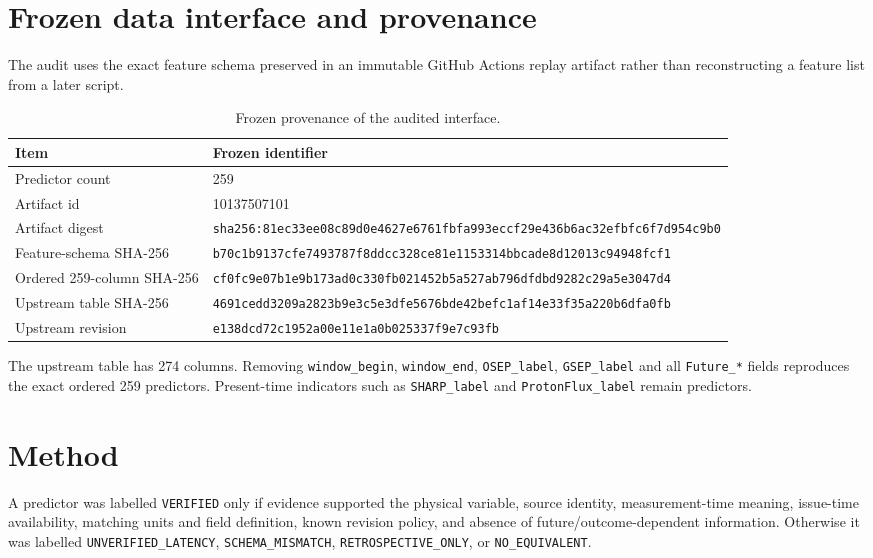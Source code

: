 \documentclass[11pt]{article}
\begin{document}
\section{Frozen data interface and provenance}
The audit uses the exact feature schema preserved in an immutable GitHub Actions replay artifact rather than reconstructing a feature list from a later script.

\begin{table}[h]\centering
\begin{tabular}{p{}p{}}\toprule
Item & Frozen identifier \\\midrule
Predictor count & 259 \\
Artifact id & 10137507101 \\
Artifact digest & \texttt{sha256:81ec33ee08c89d0e4627e6761fbfa993eccf29e436b6ac32efbfc6f7d954c9b0} \\
Feature-schema SHA-256 & \texttt{b70c1b9137cfe7493787f8ddcc328ce81e1153314bbcade8d12013c94948fcf1} \\
Ordered 259-column SHA-256 & \texttt{cf0fc9e07b1e9b173ad0c330fb021452b5a527ab796dfdbd9282c29a5e3047d4} \\
Upstream table SHA-256 & \texttt{4691cedd3209a2823b9e3c5e3dfe5676bde42befc1af14e33f35a220b6dfa0fb} \\
Upstream revision & \texttt{e138dcd72c1952a00e11e1a0b025337f9e7c93fb} \\\bottomrule
\end{tabular}\caption{Frozen provenance of the audited interface.}\end{table}

The upstream table has 274 columns. Removing \texttt{window\_begin}, \texttt{window\_end}, \texttt{OSEP\_label}, \texttt{GSEP\_label} and all \texttt{Future\_*} fields reproduces the exact ordered 259 predictors. Present-time indicators such as \texttt{SHARP\_label} and \texttt{ProtonFlux\_label} remain predictors.

\section{Method}
A predictor was labelled \texttt{VERIFIED} only if evidence supported the physical variable, source identity, measurement-time meaning, issue-time availability, matching units and field definition, known revision policy, and absence of future/outcome-dependent information. Otherwise it was labelled \texttt{UNVERIFIED\_LATENCY}, \texttt{SCHEMA\_MISMATCH}, \texttt{RETROSPECTIVE\_ONLY}, or \texttt{NO\_EQUIVALENT}.
\end{document}
